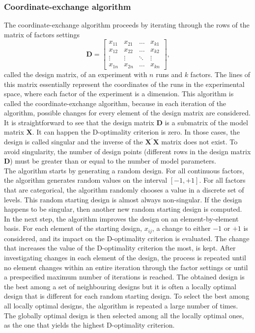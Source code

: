 \subsubsection{Coordinate-exchange algorithm}
The coordinate-exchange algorithm proceeds by iterating through the rows of the matrix of factors settings
\begin{equation}
\mathbf{D}= 
    \begin{bmatrix}
        x_{11} & x_{21} & \ldots & x_{k1} \\
        x_{12} & x_{22} & \ldots & x_{k2} \\
        \vdots & \vdots & \ddots & \vdots \\
        x_{1n} & x_{2n} & \ldots & x_{kn} 
    \end{bmatrix}
    \text{,}
    \label{mat:design_matrix}
\end{equation}
called the design matrix, of an experiment with $n$ runs and $k$ factors. The lines of this matrix essentially represent the coordinates of the runs in the experimental space, where each factor of the experiment is a dimension. This algorithm is called the coordinate-exchange algorithm, because in each iteration of the algorithm, possible changes for every element of the design matrix are considered. \\
It is straightforward to see that the design matrix $\mathbf{D}$ is a submatrix of the model matrix $\mathbf{X}$. It can happen the D-optimality criterion is zero. In those cases, the design is called singular and the inverse of the $\mathbf{X}^{\prime}\mathbf{X}$ matrix does not exist. To avoid singularity, the number of design points (different rows in the design matrix $\mathbf{D}$) must be greater than or equal to the number of model parameters.\\

The algorithm starts by generating a random design. For all continuous factors, the algorithm generates random values on the interval $[-1,+1]$. For all factors that are categorical, the algorithm randomly chooses a value in a discrete set of levels. This random starting design is almost always non-singular. If the design happens to be singular, then another new random starting design is computed.\\
In the next step, the algorithm improves the design on an element-by-element basis. For each element of the starting design, $x_{ij}$, a change to either $-1$ or $+1$ is considered, and its impact on the D-optimality criterion is evaluated. The change that increases the value of the D-optimality criterion the most, is kept. After investigating changes in each element of the design, the process is repeated until no element changes within an entire iteration through the factor settings or until a prespecified maximum number of iterations is reached. The obtained design is the best among a set of neighbouring designs but it is often a locally optimal design that is different for each random starting design. To select the best among all locally optimal designs, the algorithm is repeated a large number of times. The globally optimal design is then selected among all the locally optimal ones, as the one that yields the highest D-optimality criterion.

